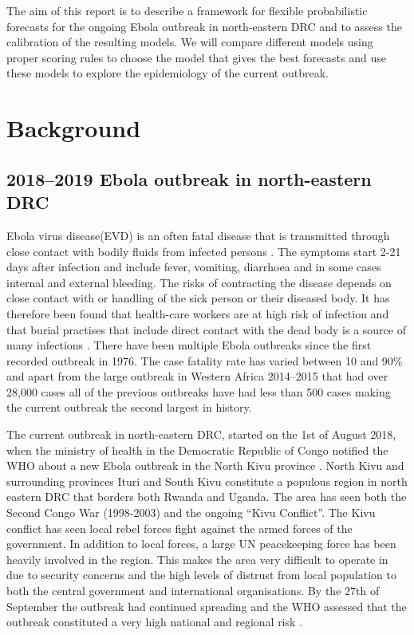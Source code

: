 \documentclass[12pt]{article}
\begin{document}
The aim of this report is to describe a framework for flexible probabilistic forecasts for the ongoing Ebola outbreak in north-eastern DRC and to assess the calibration of the resulting models. We will compare different models using proper scoring rules to choose the model that gives the best forecasts and use these models to explore the epidemiology of the current outbreak. 

\section{Background}
\subsection{2018--2019 Ebola outbreak in north-eastern DRC}

Ebola virus disease(EVD) is an often fatal disease that is transmitted through close contact with bodily fluids from infected persons \cite{worldhealthorganisationEbolaVirusDisease}. The symptoms start 2-21 days after infection and include fever, vomiting, diarrhoea and in some cases internal and external bleeding. The risks of contracting the disease depends on close contact with or handling of the sick person or their diseased body. It has therefore been found that health-care workers are at high risk of infection and that burial practises that include direct contact with the dead body is a source of many infections \cite{brainardRiskFactorsTransmission2016}. There have been multiple Ebola outbreaks since the first recorded outbreak in 1976. The case fatality rate has varied between 10 and 90\% and apart from the large outbreak in Western Africa 2014--2015 that had over 28,000 cases all of the previous outbreaks have had less than 500 cases \cite{worldhealthorganisationEbolaVirusDisease} making the current outbreak the second largest in history.

The current outbreak in north-eastern DRC, started on the 1st of August 2018, when the ministry of health in the Democratic Republic of Congo notified the WHO about a new Ebola outbreak in the North Kivu province \cite{worldhealthorganizationEbolaOutbreakDRC2018a}. North Kivu and surrounding provinces Ituri and South Kivu constitute a populous region in north eastern DRC that borders both Rwanda and Uganda. The area has seen both the Second Congo War (1998-2003) and the ongoing ``Kivu Conflict''. The Kivu conflict has seen local rebel forces fight against the armed forces of the government. In addition to local forces, a large UN peacekeeping force has been heavily involved in the region. This makes the area very difficult to operate in due to security concerns and the high levels of distrust from local population to both the central government and international organisations. By the 27th of September the outbreak had continued spreading and the WHO assessed that the outbreak constituted a very high national and regional risk \cite{worldhealthorganizationEbolaOutbreakDRC2018b}.
\end{document}
